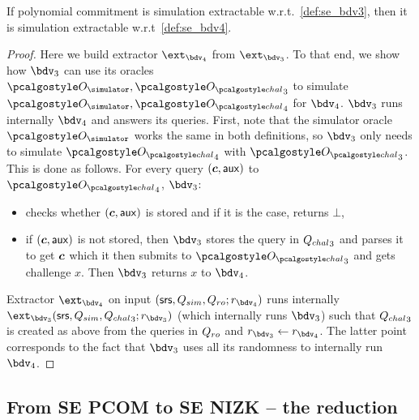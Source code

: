 \documentclass[runningheads,11pt]{llncs}
\let\spvec\vec
\let\vec\accentvec
\let\spvec\vec
\let\vec\spvec
\def\vec#1{\mathchoice{\mbox{\boldmath$\displaystyle#1$}}
  {\mbox{\boldmath$\textstyle#1$}} {\mbox{\boldmath$\scriptstyle#1$}}
  {\mbox{\boldmath$\scriptscriptstyle#1$}}}
\begin{document}
\begin{lemma}[]
  If polynomial commitment is simulation extractable w.r.t.~\cref{def:se_bdv3}, then
  it is simulation extractable w.r.t~\cref{def:se_bdv4}.
\end{lemma}
\begin{proof}
  Here we build extractor $\ext_{\bdv_4}$ from $\ext_{\bdv_3}$. To that end, we show
  how $\bdv_3$ can use its oracles $\oracles, \oraclec_3$ to simulate
  $\oracles, \oraclec_4$ for $\bdv_4$. $\bdv_3$ runs internally $\bdv_4$ and answers
  its queries. First, note that the simulator oracle $\oracles$ works the same in
  both definitions, so $\bdv_3$ only needs to simulate $\oraclec_4$ with
  $\oraclec_3$. This is done as follows. For every query $(\vec{c}, \aux)$ to
  $\oraclec_4$, $\bdv_3$:
  \begin{itemize}
  \item checks whether $(\vec{c}, \aux)$ is stored and if it is the case, returns
    $\bot$,
  \item if $(\vec{c}, \aux)$ is not stored, then $\bdv_3$ stores the query in
    ${Q_{chal}}_3$ and parses it to get $\vec{c}$ which it then submits to $\oraclec_3$
    and gets challenge $x$. Then $\bdv_3$ returns $x$ to $\bdv_4$.
  \end{itemize}

  Extractor $\ext_{\bdv_4}$ on input $(\srs, \Qsim, \Qh; r_{\bdv_4})$ runs internally
  $\ext_{\bdv_3} (\srs, \Qsim, \Qchal_3; r_{\bdv_3})$ (which internally runs
  $\bdv_3$) such that ${Q_{chal}}_3$ is created as above from the queries in $Q_{ro}$ and
  $r_{\bdv_3} \gets r_{\bdv_4}$. The latter point corresponds to the fact that
  $\bdv_3$ uses all its randomness to internally run $\bdv_4$.
\end{proof}


\subsection{From SE PCOM to SE NIZK -- the reduction}
\end{document}
